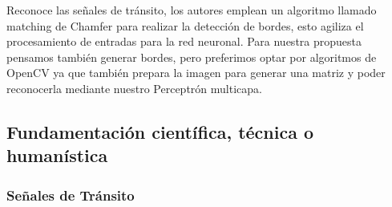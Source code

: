 \documentclass[a4paper, 12pt]{article}
\begin{document}
\vskip 1cm
\citep{arriagaGarcia} Reconoce las señales de tránsito, los autores emplean un algoritmo llamado matching de Chamfer para realizar la detección de bordes, esto agiliza el procesamiento de entradas para la red neuronal.
Para nuestra propuesta pensamos también generar bordes, pero preferimos optar por algoritmos de OpenCV ya que también prepara la imagen para generar una matriz y poder reconocerla mediante nuestro Perceptrón multicapa.\par


\subsection{Fundamentación científica, técnica o humanística}

\subsubsection{Señales de Tránsito}
\end{document}
